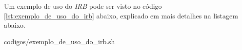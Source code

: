 Um exemplo de uso do \emph{IRB} pode ser visto 
no código \ref{lst:exemplo_de_uso_do_irb}
abaixo, explicado em mais detalhes na listagem abaixo. 

{codigos/exemplo_de_uso_do_irb.sh}

